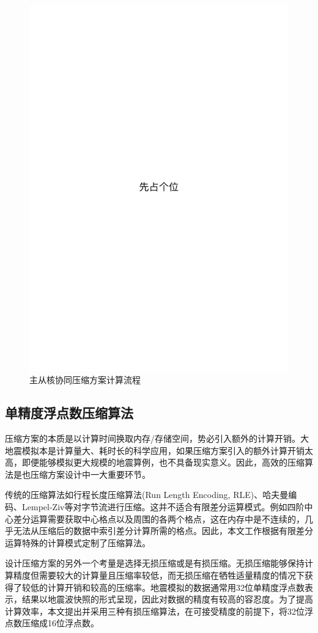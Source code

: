 \documentclass[degree=doctor]{thuthesis}
\begin{document}
\begin{figure}[ht]
\centering
\includegraphics[width=0.7\columnwidth]{figures/placeholder.pdf}
\caption{主从核协同压缩方案计算流程}
\label{fig:compression-workflow}
\end{figure}

\subsection{单精度浮点数压缩算法}

压缩方案的本质是以计算时间换取内存/存储空间，势必引入额外的计算开销。大地震模拟本是计算量大、耗时长的科学应用，如果压缩方案引入的额外计算开销太高，即便能够模拟更大规模的地震算例，也不具备现实意义。因此，高效的压缩算法是也压缩方案设计中一大重要环节。

传统的压缩算法如行程长度压缩算法(Run Length Encoding, RLE)、哈夫曼编码、Lempel-Ziv等对字节流进行压缩。这并不适合有限差分运算模式。例如四阶中心差分运算需要获取中心格点以及周围的各两个格点，这在内存中是不连续的，几乎无法从压缩后的数据中索引差分计算所需的格点。因此，本文工作根据有限差分运算特殊的计算模式定制了压缩算法。

设计压缩方案的另外一个考量是选择无损压缩或是有损压缩。无损压缩能够保持计算精度但需要较大的计算量且压缩率较低，而无损压缩在牺牲适量精度的情况下获得了较低的计算开销和较高的压缩率。地震模拟的数据通常用32位单精度浮点数表示，结果以地震波快照的形式呈现，因此对数据的精度有较高的容忍度。为了提高计算效率，本文提出并采用三种有损压缩算法，在可接受精度的前提下，将32位浮点数压缩成16位浮点数。
\end{document}
